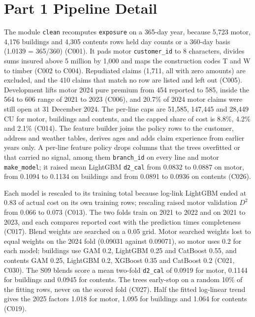 \documentclass{rapport}
\begin{document}
\section{Part 1 Pipeline Detail}
\label{ov:app-p1}

The module \texttt{clean} recomputes \texttt{exposure} on a 365-day year, because 5,723 motor, 4,176 buildings and
4,305 contents rows held day counts or a 360-day basis (1.0139 = 365/360) (C001). It pads motor \texttt{customer\_id} to 8
characters, divides sums insured above 5 million by 1,000 and maps the construction codes T and W to timber (C002 to
C004). Repudiated claims (1,711, all with zero amounts) are excluded, and the 410 claims that match no row are listed
and left out (C005). Development lifts motor 2024 pure premium from 454 reported to 585, inside the 564 to 606 range
of 2021 to 2023 (C006), and 20.7\% of 2024 motor claims were still open at 31 December 2024. The per-line caps are 51,585,
147,445 and 28,449 CU for motor, buildings and contents, and the capped share of cost is 8.8\%, 4.2\% and 2.1\% (C014).
The feature builder joins the policy rows to the customer, address and weather tables, derives ages and adds claim
experience from earlier years only. A per-line feature policy drops columns that the trees overfitted or that carried no signal, among them
\texttt{branch\_id} on every line and motor \texttt{make\_model}; it raised mean LightGBM \texttt{d2\_cal} from 0.0832 to 0.0887 on motor, from 0.1094 to 0.1134 on
buildings and from 0.0891 to 0.0936 on contents (C026).

Each model is rescaled to its training total because log-link LightGBM ended at 0.83 of actual cost on its own training
rows; rescaling raised motor validation $D^2$ from 0.066 to 0.073 (C013). The two folds train on 2021 to 2022 and on
2021 to 2023, and each compares reported cost with the prediction times completeness (C017). Blend weights are searched
on a 0.05 grid. Motor searched weights lost to equal weights on the 2024 fold (0.09031 against 0.09071), so motor uses
0.2 for each model; buildings use GAM 0.2, LightGBM 0.25 and CatBoost 0.55, and contents GAM 0.25, LightGBM 0.2,
XGBoost 0.35 and CatBoost 0.2 (C021, C030). The S09 blends score a mean two-fold \texttt{d2\_cal} of 0.0919 for motor,
0.1144 for buildings and 0.0945 for contents. The trees early-stop on a random 10\% of the fitting rows, never on
the scored fold (C027). Half the fitted log-linear trend gives the 2025 factors 1.018 for motor, 1.095 for buildings
and 1.064 for contents (C019).
\end{document}
